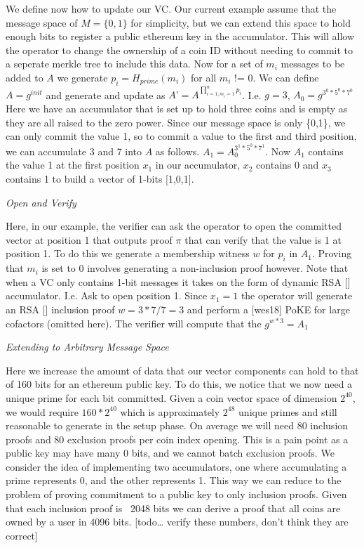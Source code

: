 \documentclass[11pt]{article}
\begin{document}
We define now how to update our VC. Our current example assume that the message space of $M = \{0,1\}$ for simplicity, but we can extend this space to hold enough bits to register a public ethereum key in the accumulator. This will allow the operator to change the ownership of a coin ID without needing to commit to a seperate merkle tree to include this data. Now for a set of $m_i$ messages to be added to $A$ we generate $p_i = H_{prime}(m_i)$ for all $m_i$ != 0. We can define $A=g^{init}$ and generate and update as $A’ = A^{\prod_{i=1, m_i=1}^{n}p_i}$. I.e. $g=3$, $A_0=g^{3^0*5^0*7^0}$ Here we have an accumulator that is set up to hold three coins and is empty as they are all raised to the zero power. Since our message space is only \{0,1\}, we can only commit the value 1, so to commit a value to the first and third position, we can accumulate 3 and 7 into $A$ as follows.  $A_1 = A_0^{3^1*5^0*7^1}$.  Now $A_1$ contains the value 1 at the first position $x_1$ in our accumulator, $x_2$ contains 0 and $x_3$ contains 1 to build a vector of 1-bits [1,0,1].
\\

\centerline{\textit{Open and Verify}}

Here, in our example, the verifier can ask the operator to open the committed vector at position 1 that outputs proof $\pi$ that can verify that the value is 1 at position 1. To do this we generate a membership witness $w$ for $p_i$ in $A_1$. Proving that $m_i$ is set to 0 involves generating a non-inclusion proof however. Note that when a VC only contains 1-bit messages it takes on the form of dynamic RSA [] accumulator. I.e. Ask to open position 1. Since $x_1 = 1$ the operator will generate an RSA [] inclusion proof $w= 3*7/7 = 3$ and perform a [wes18] PoKE for large cofactors (omitted here). The verifier will compute that the $g^{w*3} = A_1$ 
\\

\centerline{\textit{Extending to Arbitrary Message Space}}

Here we increase the amount of data that our vector components can hold to that of 160 bits for an ethereum public key. To do this, we notice that we now need a unique prime for each bit committed. Given a coin vector space of dimension $2^{40}$, we would require $160*2^{40}$ which is approximately $2^48$ unique primes and still reasonable to generate in the setup phase. On average we will need 80 inclusion proofs and 80 exclusion proofs per coin index opening. This is a pain point as a public key may have many 0 bits, and we cannot batch exclusion proofs. We consider the idea of implementing two accumulators, one where accumulating a prime represents 0, and the other represents 1. This way we can reduce to the problem of proving commitment to a public key to only inclusion proofs. Given that each inclusion proof is ~2048 bits we can derive a proof that all coins are owned by a user in 4096 bits. [todo… verify these numbers, don’t think they are correct]
\end{document}
